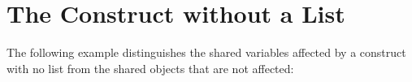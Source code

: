 \pagebreak
\section{The  Construct without a List}
\label{sec:flush_nolist}

The following example distinguishes the shared variables affected by a  
construct with no list from the shared objects that are not affected:




